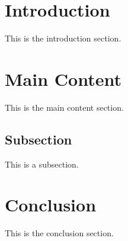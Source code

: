 \documentclass{article}[14pt]
\begin{document}


\tableofcontents

\newpage
\section{Introduction}
This is the introduction section.

\section{Main Content}
This is the main content section.

\subsection{Subsection}
This is a subsection.

\section{Conclusion}
This is the conclusion section.
\end{document}
